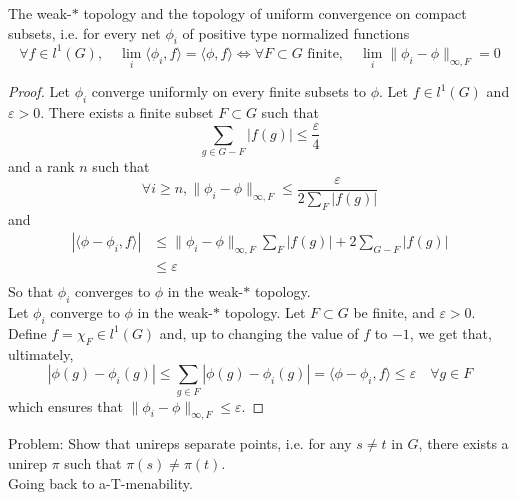 \begin{thm} [Raikov]
The weak-$*$ topology and the topology of uniform convergence on compact subsets, i.e. for every net $\phi_i$ of positive type normalized functions 
\[ \forall f \in l^1(G), \quad \lim_i\langle \phi_i , f\rangle = \langle \phi , f\rangle \iff \forall F\subset G\text{ finite}, \quad \lim_i\|\phi_i -\phi\|_{\infty , F} = 0 \] 
\end{thm} 
\begin{proof}
Let $\phi_i$ converge uniformly on every finite subsets to $\phi$. Let $f\in l^1(G)$ and $\varepsilon>0$. There exists a finite subset $F\subset G$ such that 
\[\sum_{g\in G-F} |f(g)| \leq \frac{\varepsilon}{4}\]
and a rank $n$ such that 
\[\forall i\geq n, \|\phi_i -\phi\|_{\infty , F} \leq \frac{\varepsilon }{2\sum_{F} |f(g)| }\]
and 
\[\begin{split}
|\langle \phi - \phi_i , f \rangle | & \leq \|\phi_i -\phi\|_{\infty , F} \sum_{F} |f(g)|+2\sum_{G-F}|f(g)| \\
				& \leq \varepsilon \\ 
\end{split}\]
So that $\phi_i$ converges to $\phi$ in the weak-$*$ topology.\\
 
Let $\phi_i$ converge to $\phi$ in the weak-$*$ topology. Let $F\subset G$ be finite, and $\varepsilon>0$. Define $f=\chi_F\in l^1(G)$ and, up to changing the value of $f$ to $-1$, we get that, ultimately,  
\[ |\phi(g)-\phi_i(g)|\leq \sum_{g\in F} |\phi(g)-\phi_i(g)| = \langle \phi - \phi_i , f \rangle   \leq \varepsilon \quad \forall g\in F\]
which ensures that $\|\phi_i-\phi\|_{\infty, F}\leq \varepsilon$.
\end{proof}

Problem: Show that unireps separate points, i.e. for any $s\neq t$ in $G$, there exists a unirep $\pi$ such that $\pi(s)\neq \pi(t)$. \\

Going back to a-T-menability.

